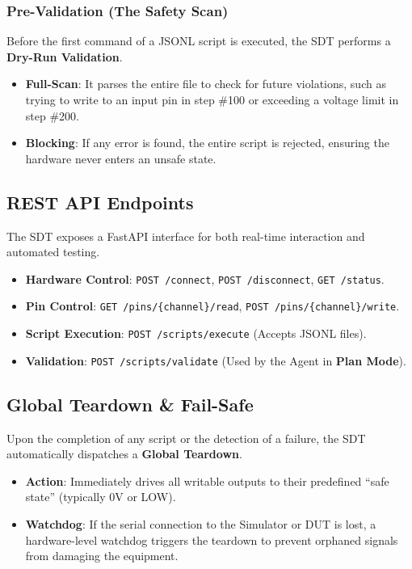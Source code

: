 \documentclass[conference]{IEEEtran}
\begin{document}
\subsubsection{Pre-Validation (The Safety Scan)}
Before the first command of a JSONL script is executed, the SDT performs a \textbf{Dry-Run Validation}.
\begin{itemize}
    \item \textbf{Full-Scan}: It parses the entire file to check for future violations, such as trying to write to an input pin in step \#100 or exceeding a voltage limit in step \#200.
    \item \textbf{Blocking}: If any error is found, the entire script is rejected, ensuring the hardware never enters an unsafe state.
\end{itemize}

\subsection{REST API Endpoints}
The SDT exposes a FastAPI interface for both real-time interaction and automated testing.
\begin{itemize}
    \item \textbf{Hardware Control}: \texttt{POST /connect}, \texttt{POST /disconnect}, \texttt{GET /status}.
    \item \textbf{Pin Control}: \texttt{GET /pins/\{channel\}/read}, \texttt{POST /pins/\{channel\}/write}.
    \item \textbf{Script Execution}: \texttt{POST /scripts/execute} (Accepts JSONL files).
    \item \textbf{Validation}: \texttt{POST /scripts/validate} (Used by the Agent in \textbf{Plan Mode}).
\end{itemize}

\subsection{Global Teardown \& Fail-Safe}
Upon the completion of any script or the detection of a failure, the SDT automatically dispatches a \textbf{Global Teardown}.
\begin{itemize}
    \item \textbf{Action}: Immediately drives all writable outputs to their predefined ``safe state'' (typically 0V or LOW).
    \item \textbf{Watchdog}: If the serial connection to the Simulator or DUT is lost, a hardware-level watchdog triggers the teardown to prevent orphaned signals from damaging the equipment.
\end{itemize}
\end{document}
